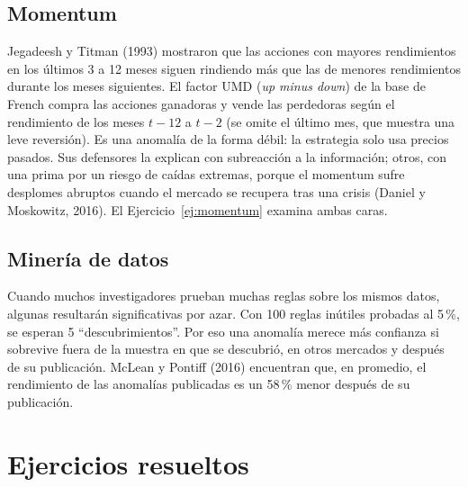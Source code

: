 \subsection{Momentum}

Jegadeesh y Titman (1993) mostraron que las acciones con mayores rendimientos en los últimos 3 a 12 meses
siguen rindiendo más que las de menores rendimientos durante los meses siguientes. El factor UMD (\emph{up
minus down}) de la base de French compra las acciones ganadoras y vende las perdedoras según el rendimiento de
los meses $t-12$ a $t-2$ (se omite el último mes, que muestra una leve reversión). Es una anomalía de la forma
débil: la estrategia solo usa precios pasados. Sus defensores la explican con subreacción a la información;
otros, con una prima por un riesgo de caídas extremas, porque el momentum sufre desplomes abruptos cuando el
mercado se recupera tras una crisis (Daniel y Moskowitz, 2016). El Ejercicio~\ref{ej:momentum} examina ambas
caras.

\subsection{Minería de datos}
Cuando muchos investigadores prueban muchas reglas sobre los mismos datos, algunas resultarán significativas por
azar. Con 100 reglas inútiles probadas al 5\,\%, se esperan 5 ``descubrimientos''. Por eso una anomalía merece
más confianza si sobrevive fuera de la muestra en que se descubrió, en otros mercados y después de su
publicación. McLean y Pontiff (2016) encuentran que, en promedio, el rendimiento de las anomalías publicadas es un
58\,\% menor después de su publicación.

\section{Ejercicios resueltos}

